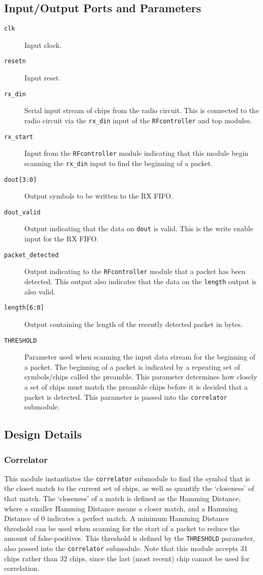 \subsection{Input/Output Ports and Parameters}
\begin{description}
	\item[\texttt{clk}] Input clock.
	\item[\texttt{resetn}] Input reset.
	\item[\texttt{rx\_din}] Serial input stream of chips from the radio circuit. This is connected to the radio circuit via the \texttt{rx\_din} input of the \texttt{RFcontroller} and top modules.
	\item[\texttt{rx\_start}] Input from the \texttt{RFcontroller} module indicating that this module begin scanning the \texttt{rx\_din} input to find the beginning of a packet.
	\item[\texttt{dout[3:0]}] Output symbols to be written to the RX FIFO.
	\item[\texttt{dout\_valid}] Output indicating that the data on \texttt{dout} is valid. This is the write enable input for the RX FIFO.
	\item[\texttt{packet\_detected}] Output indicating to the \texttt{RFcontroller} module that a packet has been detected. This output also indicates that the data on the \texttt{length} output is also valid.
	\item[\texttt{length[6:0]}] Output containing the length of the recently detected packet in bytes.
	\item[\texttt{THRESHOLD}] Parameter used when scanning the input data stream for the beginning of a packet. The beginning of a packet is indicated by a repeating set of symbols/chips called the preamble. This parameter determines how closely a set of chips must match the preamble chips before it is decided that a packet is detected. This parameter is passed into the \texttt{correlator} submodule.
\end{description}

\subsection{Design Details}
\subsubsection{Correlator}
This module instantiates the \texttt{correlator} submodule to find the symbol that is the closet match to the current set of chips, as well as quantify the `closeness' of that match. The `closeness' of a match is defined as the Hamming Distance, where a smaller Hamming Distance means a closer match, and a Hamming Distance of 0 indicates a perfect match. A minimum Hamming Distance threshold can be used when scanning for the start of a packet to reduce the amount of false-positives. This threshold is defined by the \texttt{THRESHOLD} parameter, also passed into the \texttt{correlator} submodule. Note that this module accepts 31 chips rather than 32 chips, since the last (most recent) chip cannot be used for correlation.

